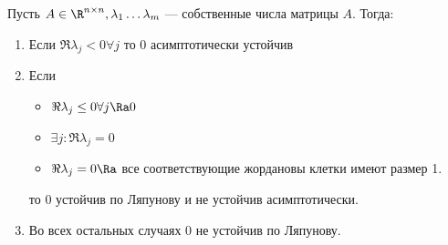 \begin{theorem}
    Пусть \(A \in \R^{n \times n}, \lambda_1 \dots \lambda_m\) --- собственные числа матрицы \(A\). Тогда:
    \begin{enumerate}
        \item Если \(\Re \lambda_j < 0 \forall j\) то \(0\) асимптотически устойчив
        \item Если
        \begin{itemize}
            \item \(\Re \lambda_j \le 0 \forall j \Ra 0\)
            \item \(\exists j: \Re \lambda_j = 0\)
            \item \(\Re \lambda_j = 0 \Ra\) все соответствующие жордановы клетки имеют размер 1.
        \end{itemize}
        то \(0\) устойчив по Ляпунову и не устойчив асимптотически.
        \item Во всех остальных случаях \(0\) не устойчив по Ляпунову.
    \end{enumerate}
\end{theorem}
